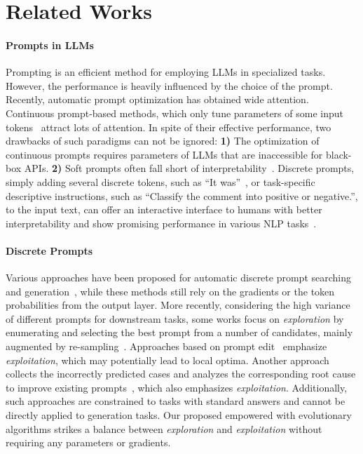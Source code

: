 \section{Related Works}
\label{sec:related}
\paragraph{Prompts in LLMs} Prompting is an efficient method for employing LLMs in specialized tasks. However, the performance is heavily influenced by the choice of the prompt. Recently, automatic prompt optimization has obtained wide attention.
Continuous prompt-based methods, which only tune parameters of some input tokens~\citep{li2021prefix,liu2021gpt,liu2021p,zhang2021differentiable} attract lots of attention. In spite of their effective performance, two drawbacks of such paradigms can not be ignored: \textbf{1)} The optimization of continuous prompts requires parameters of LLMs that are inaccessible for black-box APIs. 
\textbf{2)} Soft prompts often fall short of interpretability~\citep{lester2021promptuning}. Discrete prompts, simply adding several discrete tokens, such as ``It was''~\citep{schick2021exploiting}, or task-specific descriptive instructions, such as ``Classify the comment into positive or negative.'', to the input text, can offer an interactive interface to humans with better interpretability and show promising performance in various NLP tasks~\citep{liu2023pre}.


\paragraph{Discrete Prompts} 
Various approaches have been proposed for automatic discrete prompt searching and generation~\citep{shin2020autoprompt,shi2022toward,wallace2019universal,deng2022rlprompt,zhang2023tempera}, while these methods still rely on the gradients or the token probabilities from the output layer. More recently, considering the high variance of different prompts for downstream tasks, some works focus on \emph{exploration} by enumerating and selecting the best prompt from a number of candidates, mainly augmented by re-sampling~\citep{zhou2022large,jiang2020can}. Approaches based on prompt edit~\citep{zhang2023tempera,prasad2022grips} emphasize \emph{exploitation}, which may potentially lead to local optima. Another approach collects the incorrectly predicted cases and analyzes the corresponding root cause to improve existing prompts~\citep{pryzant2023automatic,guo2023learning}, which also emphasizes \emph{exploitation}. Additionally, such approaches are constrained to tasks with standard answers and cannot be directly applied to generation tasks. Our proposed \modelname empowered with evolutionary algorithms strikes a balance between \emph{exploration} and \emph{exploitation} without requiring any parameters or gradients.

